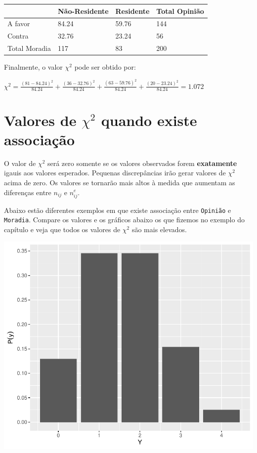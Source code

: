 \documentclass[
]{book}
\begin{document}
\begin{longtable}[]{@{}llll@{}}
\toprule
& Não-Residente & Residente & Total Opinião \\
\midrule
\endhead
A favor & 84.24 & 59.76 & 144 \\
Contra & 32.76 & 23.24 & 56 \\
Total Moradia & 117 & 83 & 200 \\
\bottomrule
\end{longtable}

Finalmente, o valor \(\chi^2\) pode ser obtido por:

\(\chi^2 = \frac{(81 - 84.24)^2}{84.24} + \frac{(36 - 32.76)^2}{84.24} + \frac{(63 - 59.76)^2}{84.24} + \frac{(20 - 23.24)^2}{84.24} = 1.072\)

\hypertarget{valores-de-chi2-quando-existe-associauxe7uxe3o}{%
\section{\texorpdfstring{Valores de \(\chi^2\) quando existe associação}{Valores de \textbackslash chi\^{}2 quando existe associação}}\label{valores-de-chi2-quando-existe-associauxe7uxe3o}}

O valor de \(\chi^2\) será zero somente se os valores observados forem \textbf{exatamente} igauis aos valores esperados. Pequenas discrepâncias irão gerar valores de \(\chi^2\) acima de zero. Os valores se tornarão mais altos à medida que aumentam as diferenças entre \(n_{ij}\) e \(n_{ij}^e\).

Abaixo estão diferentes exemplos em que existe associação entre \texttt{Opinião} e \texttt{Moradia}. Compare os valores e os gráficos abaixo os que fizemos no exemplo do capítulo e veja que todos os valores de \(\chi^2\) são mais elevados.

\begin{flushleft}\includegraphics{probest-cambientais_files/figure-latex/unnamed-chunk-196-1} \end{flushleft}
\end{document}
